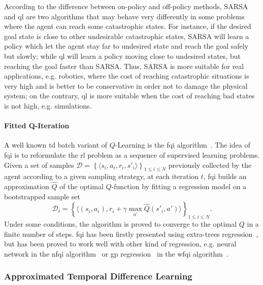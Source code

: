 According to the difference between on-policy and off-policy methods, SARSA and \gls{ql} are two algorithms that may behave very differently in some problems where the agent can reach some catastrophic states. For instance, if the desired goal state is close to other undesirable catastrophic states, SARSA will learn a policy which let the agent stay far to undesired state and reach the goal safely but slowly; while \gls{ql} will learn a policy moving close to undesired states, but reaching the goal faster than SARSA. Thus, SARSA is more suitable for real applications, e.g. robotics, where the cost of reaching catastrophic situations is very high and is better to be conservative in order not to damage the physical system; on the contrary, \gls{ql} is more suitable when the cost of reaching bad states is not high, e.g. simulations.

\paragraph{Fitted Q-Iteration}\label{S:FQI}
A well known \gls{td} batch variant of $Q$-Learning is the \gls{fqi} algorithm~\cite{ernst2005tree}. The idea of \gls{fqi} is to reformulate the \gls{rl} problem as a sequence of supervised learning problems. Given a set of samples $\mathcal{D} = \left\{\langle s_i, a_i, r_i, s'_i \rangle \right\}_{1\leq i\leq N}$ previously collected by the agent according to a given sampling strategy, at each iteration $t$, \gls{fqi} builds an approximation $\hat{Q}$ of the optimal $Q$-function by fitting a regression model on a bootstrapped sample set
\begin{equation}
 \mathcal{D}_t = \left\{ \langle (s_i,a_i), r_i + \gamma \max_{a'} \hat{Q}\left(s'_i, a'\right) \rangle\right\}_{1 \leq i \leq N}.
\end{equation}
Under some conditions, the algorithm is proved to converge to the optimal $Q$ in a finite number of steps. \gls{fqi} has been firstly presented using extra-trees regression~\cite{geurts2006extremely}, but has been proved to work well with other kind of regression, e.g. neural network in the \gls{nfqi} algorithm~\cite{riedmiller2005neural} or \gls{gp} regression~\cite{rasmussen2005gaussian} in the \gls{wfqi} algorithm~\cite{deramo2017maximum}.

\subsubsection{Approximated Temporal Difference Learning}

